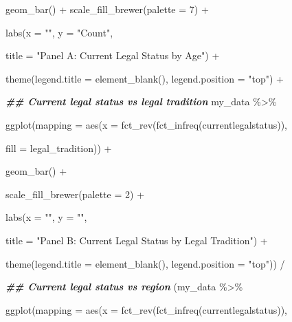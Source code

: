 \documentclass[a4paper,nobind]{templates/ociamthesis}
\newenvironment{Shaded}{\begin{snugshade}}{\end{snugshade}}
\newcommand{\AttributeTok}[1]{\textcolor[rgb]{0.77,0.63,0.00}{#1}}
\newcommand{\DecValTok}[1]{\textcolor[rgb]{0.00,0.00,0.81}{#1}}
\newcommand{\DocumentationTok}[1]{\textcolor[rgb]{0.56,0.35,0.01}{\textbf{\textit{#1}}}}
\newcommand{\FunctionTok}[1]{\textcolor[rgb]{0.00,0.00,0.00}{#1}}
\newcommand{\NormalTok}[1]{#1}
\newcommand{\SpecialCharTok}[1]{\textcolor[rgb]{0.00,0.00,0.00}{#1}}
\newcommand{\StringTok}[1]{\textcolor[rgb]{0.31,0.60,0.02}{#1}}
\renewenvironment{Shaded}
{
  \vspace{10pt}%
  \begin{snugshade}%
}{%
  \end{snugshade}%
  \vspace{8pt}%
}
\begin{document}
\begin{landscape}
\begin{Shaded}
\begin{Highlighting}[]
  \FunctionTok{geom\_bar}\NormalTok{() }\SpecialCharTok{+} \FunctionTok{scale\_fill\_brewer}\NormalTok{(}\AttributeTok{palette =} \DecValTok{7}\NormalTok{) }\SpecialCharTok{+} 
  
  \FunctionTok{labs}\NormalTok{(}\AttributeTok{x =} \StringTok{""}\NormalTok{, }\AttributeTok{y =} \StringTok{"Count"}\NormalTok{, }
       
       \AttributeTok{title =} \StringTok{"Panel A: Current Legal Status by Age"}\NormalTok{) }\SpecialCharTok{+} 
   
   \FunctionTok{theme}\NormalTok{(}\AttributeTok{legend.title =} \FunctionTok{element\_blank}\NormalTok{(), }\AttributeTok{legend.position =} \StringTok{"top"}\NormalTok{) }\SpecialCharTok{+} 


\DocumentationTok{\#\# Current legal status vs legal tradition}
\NormalTok{my\_data }\SpecialCharTok{\%\textgreater{}\%} 
  
\FunctionTok{ggplot}\NormalTok{(}\AttributeTok{mapping =} \FunctionTok{aes}\NormalTok{(}\AttributeTok{x =} \FunctionTok{fct\_rev}\NormalTok{(}\FunctionTok{fct\_infreq}\NormalTok{(currentlegalstatus)), }
                     
                     \AttributeTok{fill =}\NormalTok{ legal\_tradition)) }\SpecialCharTok{+} 
  
  \FunctionTok{geom\_bar}\NormalTok{() }\SpecialCharTok{+} 
  
  \FunctionTok{scale\_fill\_brewer}\NormalTok{(}\AttributeTok{palette =} \DecValTok{2}\NormalTok{) }\SpecialCharTok{+} 
  
  \FunctionTok{labs}\NormalTok{(}\AttributeTok{x =} \StringTok{""}\NormalTok{, }\AttributeTok{y =} \StringTok{""}\NormalTok{, }
       
       \AttributeTok{title =} \StringTok{"Panel B: Current Legal Status by Legal Tradition"}\NormalTok{) }\SpecialCharTok{+} 
  
  \FunctionTok{theme}\NormalTok{(}\AttributeTok{legend.title =} \FunctionTok{element\_blank}\NormalTok{(), }\AttributeTok{legend.position =} \StringTok{"top"}\NormalTok{)) }\SpecialCharTok{/}

\DocumentationTok{\#\# Current legal status vs region}
\NormalTok{(my\_data }\SpecialCharTok{\%\textgreater{}\%} 
  
\FunctionTok{ggplot}\NormalTok{(}\AttributeTok{mapping =} \FunctionTok{aes}\NormalTok{(}\AttributeTok{x =} \FunctionTok{fct\_rev}\NormalTok{(}\FunctionTok{fct\_infreq}\NormalTok{(currentlegalstatus)), }
                     

\end{Highlighting}
\end{Shaded}
\end{landscape}
\end{document}
